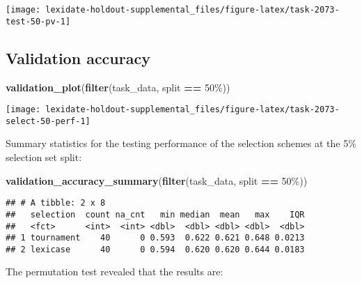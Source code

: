 \documentclass[
]{book}
\newenvironment{Shaded}{\begin{snugshade}}{\end{snugshade}}
\newcommand{\FunctionTok}[1]{\textcolor[rgb]{0.13,0.29,0.53}{\textbf{#1}}}
\newcommand{\NormalTok}[1]{#1}
\newcommand{\SpecialCharTok}[1]{\textcolor[rgb]{0.81,0.36,0.00}{\textbf{#1}}}
\newcommand{\StringTok}[1]{\textcolor[rgb]{0.31,0.60,0.02}{#1}}
\begin{document}
\texttt{[image: lexidate-holdout-supplemental\_files/figure-latex/task-2073-test-50-pv-1]}

\hypertarget{validation-accuracy-42}{%
\subsection{Validation accuracy}\label{validation-accuracy-42}}

\begin{Shaded}
\begin{Highlighting}[]
\FunctionTok{validation\_plot}\NormalTok{(}\FunctionTok{filter}\NormalTok{(task\_data, split }\SpecialCharTok{==} \StringTok{\textquotesingle{}50\%\textquotesingle{}}\NormalTok{))}
\end{Highlighting}
\end{Shaded}

\texttt{[image: lexidate-holdout-supplemental\_files/figure-latex/task-2073-select-50-perf-1]}

Summary statistics for the testing performance of the selection schemes at the 5\% selection set split:

\begin{Shaded}
\begin{Highlighting}[]
\FunctionTok{validation\_accuracy\_summary}\NormalTok{(}\FunctionTok{filter}\NormalTok{(task\_data, split }\SpecialCharTok{==} \StringTok{\textquotesingle{}50\%\textquotesingle{}}\NormalTok{))}
\end{Highlighting}
\end{Shaded}

\begin{verbatim}
## # A tibble: 2 x 8
##   selection  count na_cnt   min median  mean   max    IQR
##   <fct>      <int>  <int> <dbl>  <dbl> <dbl> <dbl>  <dbl>
## 1 tournament    40      0 0.593  0.622 0.621 0.648 0.0213
## 2 lexicase      40      0 0.594  0.620 0.620 0.644 0.0183
\end{verbatim}

The permutation test revealed that the results are:
\end{document}
